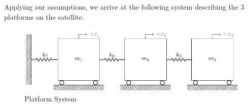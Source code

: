 \documentclass{article}
\begin{document}
\newpage

Applying our assumptions, we arrive at the following system describing the 3 platforms on the satellite.

\begin{figure}[H]
    \vspace{-10pt}
    \includegraphics[width=1\textwidth,left]{MCHE 6390/Project 2/Figures/Figure_2.pdf}
    \captionsetup{justification=raggedright,singlelinecheck=false}
    \caption{Platform System}
    \label{fig:Platform}
\end{figure}
\end{document}
